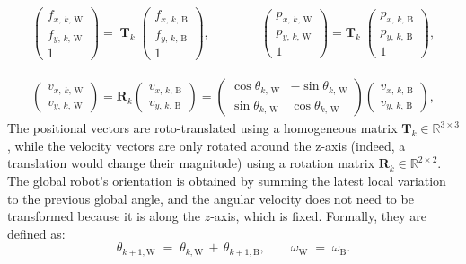 \begin{align}
    \begin{pmatrix} 
        f_{x,\,k,\,\text{W} } \\
        f_{y,\,k,\,\text{W}} \\ 
        1 
    \end{pmatrix} = \; 
    \mathbf{T}_k \;
    \begin{pmatrix}
        f_{x,\,k,\,\text{B} } \\
         f_{y,\,k,\,\text{B}} \\
          1
    \end{pmatrix},\qquad \qquad
    \begin{pmatrix}
        p_{x,\,k,\,\text{W} } \\
        p_{y,\,k,\,\text{W}} \\[1ex]
        1
    \end{pmatrix}
    = \mathbf{T}_k \;
    \begin{pmatrix}
        p_{x,\,k,\,\text{B} } \\
        p_{y,\,k,\,\text{B}} \\[1ex]
        1
    \end{pmatrix},
\end{align}

\begin{align}
    \begin{pmatrix}
        v_{x,\,k,\,\text{W} } \\[1ex]
        v_{y,\,k,\,\text{W}}
    \end{pmatrix}
    = \mathbf{R}_k 
    \begin{pmatrix}
        v_{x,\,k,\,\text{B} } \\[1ex]
        v_{y,\,k,\,\text{B}}
    \end{pmatrix}
    =
    \begin{pmatrix}
        \cos\theta_{k,\, \text{W}} & -\sin\theta_{k,\, \text{W}} \\[1ex]
        \sin\theta_{k,\, \text{W}} & \cos\theta_{k,\, \text{W}}
    \end{pmatrix}
    \begin{pmatrix}
        v_{x,\,k,\,\text{B} } \\[1ex]
        v_{y,\,k,\,\text{B}}
    \end{pmatrix},
\end{align}
The positional vectors are roto-translated using a homogeneous matrix $ \mathbf{T}_k \in \mathbb{R}^{3\times3}$, while the velocity vectors are only rotated around the z-axis (indeed, a translation would change their magnitude) using a rotation matrix $\mathbf{R}_k \in \mathbb{R}^{2\times2}$.\\
The global robot's orientation is obtained by summing the latest local variation to the previous global angle, and the angular velocity does not need to be transformed because it is along the $z$-axis, which is fixed. Formally, they are defined as:
\begin{equation}
    \theta_{k+1, \text{W}} \;=\; \theta_{k, \text{W}} \,+\, \theta_{k+1, \text{B}},
    \qquad
    \omega_{\text{W}} \;=\; \omega_{\text{B}}.
\end{equation}

